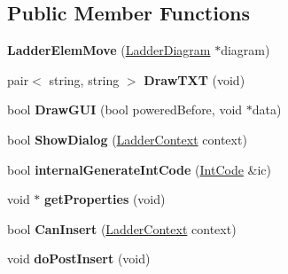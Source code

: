 \subsection*{Public Member Functions}
\begin{DoxyCompactItemize}
\item 
\hypertarget{class_ladder_elem_move_a7dae75a067815aedba76c298ea974c1d}{{\bfseries Ladder\-Elem\-Move} (\hyperlink{class_ladder_diagram}{Ladder\-Diagram} $\ast$diagram)}\label{class_ladder_elem_move_a7dae75a067815aedba76c298ea974c1d}

\item 
\hypertarget{class_ladder_elem_move_a266402443b921d0e9efd5ad81a990d89}{pair$<$ string, string $>$ {\bfseries Draw\-T\-X\-T} (void)}\label{class_ladder_elem_move_a266402443b921d0e9efd5ad81a990d89}

\item 
\hypertarget{class_ladder_elem_move_a76ea6383b6fb9f163123badc206225cc}{bool {\bfseries Draw\-G\-U\-I} (bool powered\-Before, void $\ast$data)}\label{class_ladder_elem_move_a76ea6383b6fb9f163123badc206225cc}

\item 
\hypertarget{class_ladder_elem_move_a77b23edfb8ea00b3adeb25d4a6b581ec}{bool {\bfseries Show\-Dialog} (\hyperlink{struct_ladder_context}{Ladder\-Context} context)}\label{class_ladder_elem_move_a77b23edfb8ea00b3adeb25d4a6b581ec}

\item 
\hypertarget{class_ladder_elem_move_acff186c61d99a92e06b19b1a9871cf53}{bool {\bfseries internal\-Generate\-Int\-Code} (\hyperlink{class_int_code}{Int\-Code} \&ic)}\label{class_ladder_elem_move_acff186c61d99a92e06b19b1a9871cf53}

\item 
\hypertarget{class_ladder_elem_move_adad8c2466d0fb36be35ec18e38c1038f}{void $\ast$ {\bfseries get\-Properties} (void)}\label{class_ladder_elem_move_adad8c2466d0fb36be35ec18e38c1038f}

\item 
\hypertarget{class_ladder_elem_move_af9ab2d1a31dad1e607d68dad35d20cb8}{bool {\bfseries Can\-Insert} (\hyperlink{struct_ladder_context}{Ladder\-Context} context)}\label{class_ladder_elem_move_af9ab2d1a31dad1e607d68dad35d20cb8}

\item 
\hypertarget{class_ladder_elem_move_a97a51431de1402768710c053fc6992fb}{void {\bfseries do\-Post\-Insert} (void)}\label{class_ladder_elem_move_a97a51431de1402768710c053fc6992fb}


\end{DoxyCompactItemize}
